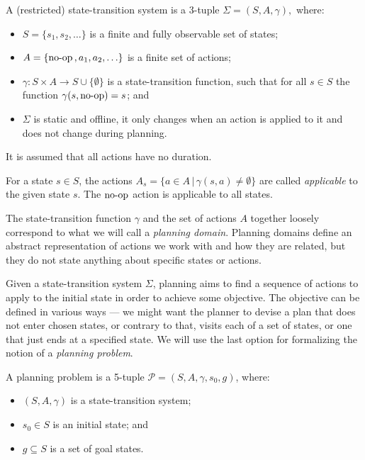 \begin{defn}\label{defn:state-transition-sys}
A (restricted) state-transition system is a 3-tuple $\Sigma = (S, A, \gamma),$ where:
\begin{itemize}
\item $S = \{s_1, s_2, \ldots\}$ is a finite and fully observable set of states;
\item $A = \{\operatorname{\textrm{no-op}}{}, a_1, a_2, \ldots\}$ is a finite set of actions;
\item $\gamma: S \times A \to S \cup \{\emptyset\}$ is a state-transition function,
such that for all $s \in S$ the function $\gamma(s, \operatorname{\textrm{no-op}}) = s$; and
\item $\Sigma$ is static and offline,
it only changes when an action is applied to it and does not change during planning.
\end{itemize}
It is assumed that all actions have no duration.
\end{defn}

For a state $s \in S$, the actions $A_s = \{a \in A \,|\, \gamma(s, a) \neq \emptyset\}$ are called \textit{applicable}
to the given state $s$. The $\operatorname{\textrm{no-op}}$ action is applicable to all states.

The state-transition function $\gamma$ and the set of actions $A$ together loosely correspond to what we will call a \textit{planning domain}.
Planning domains define an abstract representation of actions we work with
and how they are related,
but they do not state anything about specific states or actions.

Given a state-transition system $\Sigma$, planning aims to find a
sequence of actions to apply to the initial state in order to achieve some objective.
The objective can be defined in various ways --- we might want the planner
to devise a plan that
does not enter chosen states, or contrary to that, visits each of a set of states,
or one that just ends at a specified state.
We will use the last option for formalizing the notion of a \textit{planning problem}.

\begin{defn}\label{defn:planning-problem}\citep[Part~I]{Ghallab2004}
A planning problem is a 5-tuple $\mathcal{P} = (S, A, \gamma, s_0, g)$, where:
\begin{itemize}
\item $(S, A, \gamma)$ is a state-transition system;
\item $s_0 \in S$ is an initial state; and
\item $g \subseteq S$ is a set of goal states.
\end{itemize}
\end{defn}

